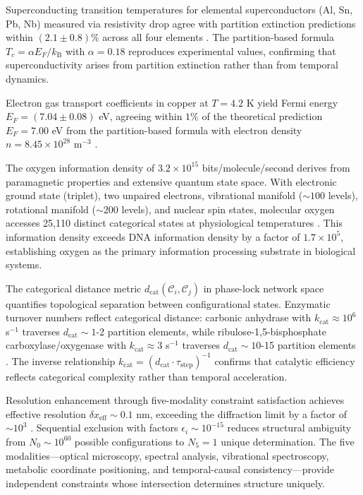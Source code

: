 \documentclass[12pt,a4paper]{article}
\theoremstyle{plain}
\theoremstyle{definition}
\theoremstyle{remark}
\newcommand{\kB}{k_{\mathrm{B}}}
\newcommand{\dcat}{d_{\mathrm{cat}}}
\begin{document}
Superconducting transition temperatures for elemental superconductors (Al, Sn, Pb, Nb) measured via resistivity drop agree with partition extinction predictions within $(2.1 \pm 0.8)\%$ across all four elements \citep{tinkham2004introduction}. The partition-based formula $T_c = \alpha E_F/\kB$ with $\alpha = 0.18$ reproduces experimental values, confirming that superconductivity arises from partition extinction rather than from temporal dynamics.

Electron gas transport coefficients in copper at $T = 4.2$ K yield Fermi energy $E_F = (7.04 \pm 0.08)$ eV, agreeing within $1\%$ of the theoretical prediction $E_F = 7.00$ eV from the partition-based formula with electron density $n = 8.45 \times 10^{28}$ m$^{-3}$ \citep{ashcroft1976solid}.

The oxygen information density of $3.2 \times 10^{15}$ bits/molecule/second derives from paramagnetic properties and extensive quantum state space. With electronic ground state (triplet), two unpaired electrons, vibrational manifold ($\sim 100$ levels), rotational manifold ($\sim 200$ levels), and nuclear spin states, molecular oxygen accesses 25,110 distinct categorical states at physiological temperatures \citep{herzberg1950molecular,steinfeld1999chemical}. This information density exceeds DNA information density by a factor of $1.7 \times 10^5$, establishing oxygen as the primary information processing substrate in biological systems.

The categorical distance metric $\dcat(\mathcal{C}_i,\mathcal{C}_j)$ in phase-lock network space quantifies topological separation between configurational states. Enzymatic turnover numbers reflect categorical distance: carbonic anhydrase with $k_{\text{cat}} \approx 10^6$ s$^{-1}$ traverses $\dcat \sim 1$-2 partition elements, while ribulose-1,5-bisphosphate carboxylase/oxygenase with $k_{\text{cat}} \approx 3$ s$^{-1}$ traverses $\dcat \sim 10$-15 partition elements \citep{silverman1988carbonic,portis2003rubisco}. The inverse relationship $k_{\text{cat}} = (\dcat \cdot \tau_{\text{step}})^{-1}$ confirms that catalytic efficiency reflects categorical complexity rather than temporal acceleration.

Resolution enhancement through five-modality constraint satisfaction achieves effective resolution $\delta x_{\text{eff}} \sim 0.1$ nm, exceeding the diffraction limit by a factor of $\sim 10^3$ \citep{abbe1873beitrage}. Sequential exclusion with factors $\epsilon_i \sim 10^{-15}$ reduces structural ambiguity from $N_0 \sim 10^{60}$ possible configurations to $N_5 = 1$ unique determination. The five modalities—optical microscopy, spectral analysis, vibrational spectroscopy, metabolic coordinate positioning, and temporal-causal consistency—provide independent constraints whose intersection determines structure uniquely.
\end{document}
